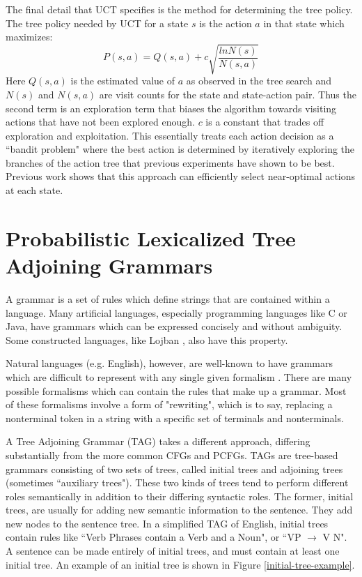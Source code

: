 The final detail that UCT specifies is the method for determining the tree policy.
The tree policy needed by UCT for a state $s$ is the action $a$ in that state which maximizes:
\begin{equation}
P(s,a) = Q(s,a) + c\sqrt{\frac{ln N(s)}{N(s,a)}}\label{eqn:uct}
\end{equation}
Here $Q(s,a)$ is the estimated value of $a$ as observed in the tree
search and $N(s)$ and $N(s,a)$ are visit counts for the state and
state-action pair. Thus the second term is an exploration term that
biases the algorithm towards visiting actions that have not been
explored enough. $c$ is a constant that trades off exploration and
exploitation. This essentially treats each action decision
as a ``bandit problem" where the best action is determined by iteratively
exploring the branches of the action tree that previous experiments
have shown to be best.  Previous work \cite{uct-go} shows that this approach can
efficiently select near-optimal actions at each state.


\section{Probabilistic Lexicalized Tree Adjoining Grammars}

A grammar is a set of rules which define strings that are contained within a language.
Many artificial languages, especially programming languages like C or Java, have
grammars which can be expressed concisely and without ambiguity.  Some
constructed languages, like Lojban \cite{lojban}, also have this property.

Natural languages (e.g. English), however, are well-known to have grammars which are difficult
to represent with any single given formalism \cite{klein2012context}. There are many possible
formalisms which can contain the rules that make up
a grammar.  Most of these formalisms involve a form of "rewriting", which
is to say, replacing a nonterminal token in a string with a specific set of
terminals and nonterminals.

A Tree Adjoining Grammar (TAG) takes a different approach, differing substantially from the more
common CFGs and PCFGs.
TAGs are tree-based grammars consisting of two sets of trees, called initial
trees and adjoining trees (sometimes ``auxiliary trees").  These two kinds of trees tend to perform
different roles semantically in addition to their differing syntactic roles.  The former,
initial trees, are usually for adding new semantic information to the sentence.  They
add new nodes to the sentence tree.  In a simplified TAG of English,
initial trees contain rules like ``Verb Phrases contain a Verb and a Noun", or ``VP $\rightarrow$ V N".
A sentence can be made entirely of initial trees, and must contain at least
one initial tree.  An example of an initial tree is shown in Figure \ref{initial-tree-example}.

